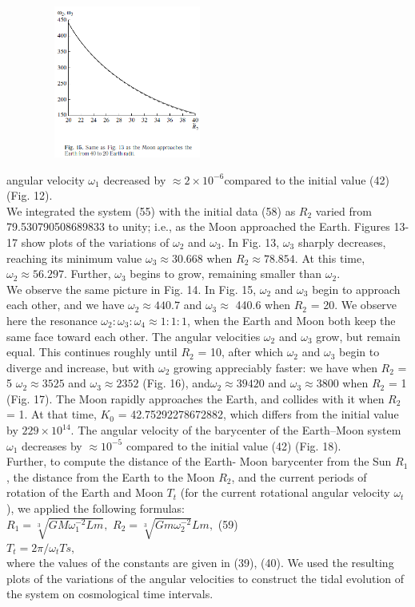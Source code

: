 \documentclass[fontsize = 11pt,a4paper]{article}
\begin{document}
\begin{multicols}{2}
\begin{flushleft}
\includegraphics[width=8cm,height=5cm]{graph15.png}
\end{flushleft}
angular velocity $\omega_1$ decreased by $\approx 2 \times 10^{-6} $compared
to the initial value (42) (Fig. 12).\\
\indent We integrated the system (55) with the initial data
(58) as $R_2$ varied from 79.530790508689833 to unity;
i.e., as the Moon approached the Earth. Figures 13-
17 show plots of the variations of $\omega_2$ and $\omega_3$. In
Fig. 13, $\omega_3$ sharply decreases, reaching its minimum
value $\omega_3 \approx 30.668$ when $R_2 \approx 78.854$. At this time,
 $\omega_2 \approx 56.297.$ Further, $\omega_3$ begins to grow, remaining
smaller than $\omega_2 $.\\
\indent We observe the same picture in Fig. 14. In Fig. 15,
$\omega_2 $ and $\omega_3$ begin to approach each other, and we
have $\omega_2  \approx 440.7$ and $\omega_3 \approx $ 440.6 when $R_2$ = 20. We
observe here the resonance  $\omega_2 : \omega_3 : \omega_4 \approx 1 : 1 : 1$,
when the Earth and Moon both keep the same face
toward each other. The angular velocities $\omega_2$ and
$\omega_3$ grow, but remain equal. This continues roughly
until $R_2$ = 10, after which $\omega_2$ and $\omega_3$ begin to diverge
and increase, but with $\omega_2$ growing appreciably
faster: we have when $R_2$ = 5 $\omega_2 \approx 3525$ and $\omega_3 \approx 
2352$ (Fig. 16), and$ \omega_2 \approx 39 420$ and $\omega_3  \approx 3800$ when
$R_2$ = 1 (Fig. 17). The Moon rapidly approaches the
Earth, and collides with it when $R_2$ = 1. At that time,
$K_0$ = 42.75292278672882, which differs from the initial
value by $229 \times 10^{14}$. The angular velocity of the
barycenter of the Earth–Moon system $\omega_1$ decreases
by $\approx {10}^{-5}$ compared to the initial value (42) (Fig. 18). \\
\indent Further, to compute the distance of the Earth-
Moon barycenter from the Sun $R_1$, the distance from
the Earth to the Moon $R_2$, and the current periods of
rotation of the Earth and Moon $T_t$ (for the current rotational
angular velocity $\omega_t$), we applied the following
formulas: \\
$R_1 = \sqrt[3]{GM\omega^{-2}_1Lm},$ $R_2 = \sqrt[3]{Gm \omega^{-2}_2} L m,$ \hfill (59) \\
$T_t = 2 \pi / \omega_t Ts,$\\
where the values of the constants are given in (39),
(40). We used the resulting plots of the variations of
the angular velocities to construct the tidal evolution
of the system on cosmological time intervals.
\end{multicols}
\end{document}
